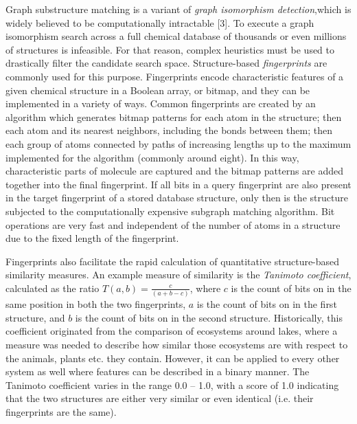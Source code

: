 \documentclass{sig-alternate}
\begin{document}
Graph substructure matching is a variant of \emph{graph isomorphism detection},which is
widely believed to be computationally intractable [3]. To execute a graph isomorphism
search across a full chemical database of thousands or even millions of
structures is infeasible. For that reason, complex heuristics must be
used to drastically filter the candidate search space. Structure-based
\emph{fingerprints} are commonly used for this purpose. Fingerprints encode
characteristic features of a given chemical structure in a Boolean array, or
bitmap, and they can be implemented in a variety of ways. Common fingerprints are created by an algorithm which generates bitmap patterns for each atom in the structure; then each atom and its nearest
neighbors, including the bonds between them; then each group of atoms connected
by paths of increasing lengths up to the maximum implemented for the algorithm
(commonly around eight). In this way, characteristic parts of molecule are captured and the bitmap patterns are added together into the final fingerprint. If all bits in a query fingerprint are also present in the target
fingerprint of a stored database structure, only then is the structure subjected
to the computationally expensive subgraph matching algorithm. Bit operations are
very fast and independent of the number of atoms in a structure due to the fixed
length of the fingerprint.

Fingerprints also facilitate the rapid calculation of quantitative
structure-based similarity measures. An example measure of similarity is the
\emph{Tanimoto coefficient}, calculated as the ratio $T(a,b) = \frac{c}{(a+b-c)}$,
where $c$ is the count of bits on in the same position in both the two
fingerprints, $a$ is the count of bits on in the first structure, and $b$ is the
count of bits on in the second structure. Historically, this coefficient originated from the comparison of ecosystems around lakes, where a measure was needed to describe how similar those ecosystems are with respect to the animals, plants etc. they contain. However, it can be applied to every other system as well where features can be described in a binary manner. The Tanimoto coefficient varies in the
range 0.0 -- 1.0, with a score of 1.0 indicating that the two structures are either very
similar or even identical (i.e. their fingerprints are the same).
\end{document}
